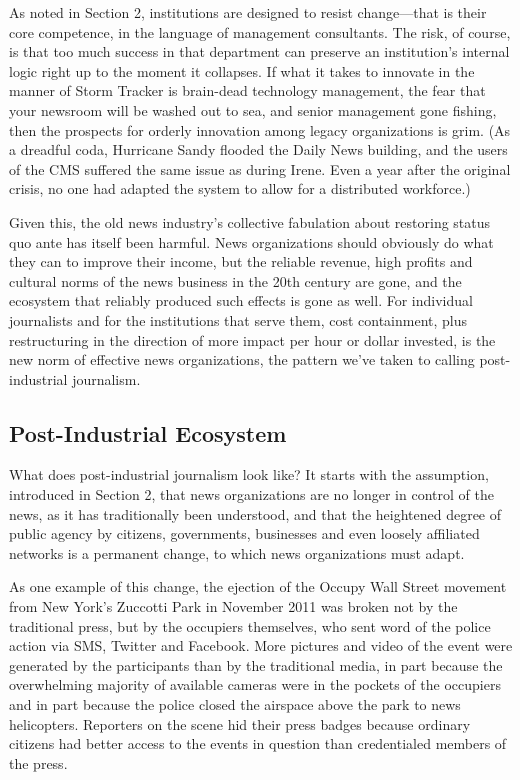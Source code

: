 As noted in Section 2, institutions are designed to resist change—that is their
core competence, in the language of management consultants. The risk, of
course, is that too much success in that department can preserve an institution’s
internal logic right up to the moment it collapses. If what it takes to innovate
in the manner of Storm Tracker is brain-dead technology management, the fear
that your newsroom will be washed out to sea, and senior management gone
fishing, then the prospects for orderly innovation among legacy organizations
is grim. (As a dreadful coda, Hurricane Sandy flooded the Daily News building,
and the users of the CMS suffered the same issue as during Irene. Even
a year after the original crisis, no one had adapted the system to allow for a
distributed workforce.)

Given this, the old news industry’s collective fabulation about restoring status
quo ante has itself been harmful. News organizations should obviously do what
they can to improve their income, but the reliable revenue, high profits and cultural
norms of the news business in the 20th century are gone, and the ecosystem
that reliably produced such effects is gone as well. For individual journalists and for the institutions that serve them, cost containment, plus restructuring in the
direction of more impact per hour or dollar invested, is the new norm of effective
news organizations, the pattern we’ve taken to calling post-industrial journalism.

\subsection{Post-Industrial Ecosystem}

What does post-industrial journalism look like? It starts with the assumption,
introduced in Section 2, that news organizations are no longer in control of the
news, as it has traditionally been understood, and that the heightened degree of
public agency by citizens, governments, businesses and even loosely affiliated
networks is a permanent change, to which news organizations must adapt.

As one example of this change, the ejection of the Occupy Wall Street movement
from New York’s Zuccotti Park in November 2011 was broken not by the traditional
press, but by the occupiers themselves, who sent word of the police action
via SMS, Twitter and Facebook. More pictures and video of the event were generated
by the participants than by the traditional media, in part because the overwhelming
majority of available cameras were in the pockets of the occupiers and
in part because the police closed the airspace above the park to news helicopters.
Reporters on the scene hid their press badges because ordinary citizens had better
access to the events in question than credentialed members of the press.

